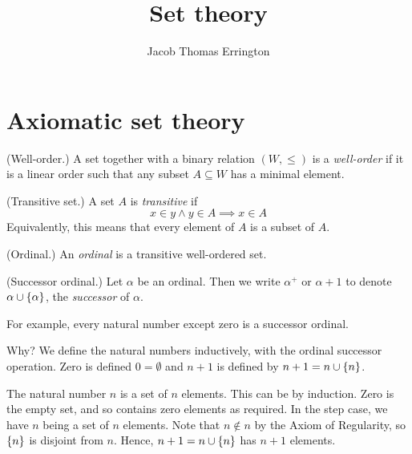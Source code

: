 \documentclass[11pt]{article}
\author{Jacob Thomas Errington}
\title{Set theory}
\date{}
\begin{document}
\maketitle

\section{Axiomatic set theory}

\begin{defn}{(Well-order.)}
    A set together with a binary relation $(W, \leq)$ is a \emph{well-order}
    if it is a linear order such that any subset $A \subseteq W$ has a minimal
    element.
\end{defn}

\begin{defn}{(Transitive set.)}
    A set $A$ is \emph{transitive} if
    \begin{equation*}
        x \in y \land y \in A \implies x \in A
    \end{equation*}
    Equivalently, this means that every element of $A$ is a subset of $A$.
\end{defn}

\begin{defn}{(Ordinal.)}
    An \emph{ordinal} is a transitive well-ordered set.
\end{defn}

\begin{defn}{(Successor ordinal.)}
    Let $\alpha$ be an ordinal.
    Then we write $\alpha^+$ or $\alpha + 1$ to denote
    $\alpha \cup \left\{\alpha\right\}$, the \emph{successor} of $\alpha$.

\end{defn}

\begin{rem}
    For example, every natural number except zero is a successor ordinal.

    Why? We define the natural numbers inductively, with the ordinal successor
    operation. Zero is defined $0 = \emptyset$ and $n + 1$ is defined by
    $n + 1 = n \cup \left\{n\right\}$.
\end{rem}

\begin{rem}
    The natural number $n$ is a set of $n$ elements.
    This can be by induction.
    Zero is the empty set, and so contains zero elements as required.
    In the step case, we have $n$ being a set of $n$ elements.
    Note that $n \notin n$ by the Axiom of Regularity,
    so $\left\{n\right\}$ is disjoint from $n$.
    Hence, $n + 1 = n \cup \left\{n\right\}$ has $n + 1$ elements.
\end{rem}
\end{document}
